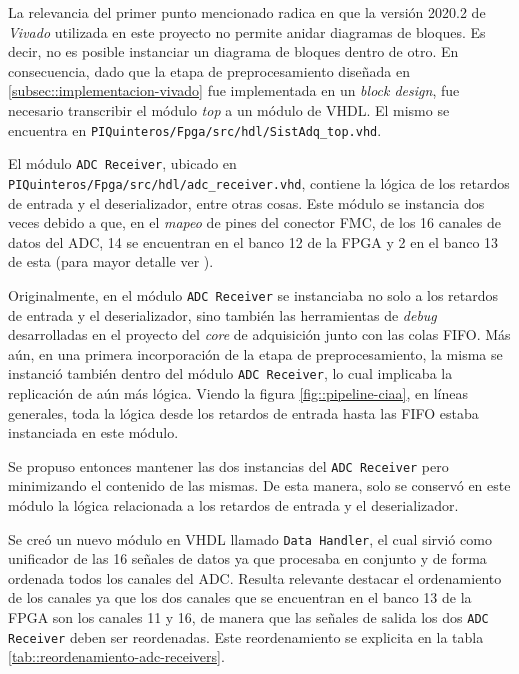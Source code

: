 \documentclass[../../main.tex]{subfiles}
\begin{document}
La relevancia del primer punto mencionado radica en que la versión 2020.2 de \textit{Vivado} utilizada en este proyecto no permite anidar diagramas de bloques. Es decir, no es posible instanciar un diagrama de bloques dentro de otro. En consecuencia, dado que la etapa de preprocesamiento diseñada en \ref{subsec::implementacion-vivado} fue implementada en un \textit{block design}, fue necesario transcribir el módulo \textit{top} a un módulo de VHDL. El mismo se encuentra en \texttt{PIQuinteros/Fpga/src/hdl/SistAdq\_top.vhd}.

El módulo \texttt{ADC Receiver}, ubicado en \texttt{PIQuinteros/Fpga/src/hdl/adc\_receiver.vhd}, contiene la lógica de los retardos de entrada y el deserializador, entre otras cosas. Este módulo se instancia dos veces debido a que, en el \textit{mapeo} de pines del conector FMC, de los 16 canales de datos del ADC, 14 se encuentran en el banco 12 de la FPGA y 2 en el banco 13 de esta (para mayor detalle ver \cite{proyecto-jose}).

Originalmente, en el módulo \texttt{ADC Receiver} se instanciaba no solo a los retardos de entrada y el deserializador, sino también las herramientas de \textit{debug} desarrolladas en el proyecto del \textit{core} de adquisición junto con las colas FIFO. Más aún, en una primera incorporación de la etapa de preprocesamiento, la misma se instanció también dentro del módulo \texttt{ADC Receiver}, lo cual implicaba la replicación de aún más lógica. Viendo la figura \ref{fig::pipeline-ciaa}, en líneas generales, toda la lógica desde los retardos de entrada hasta las FIFO estaba instanciada en este módulo.

Se propuso entonces mantener las dos instancias del \texttt{ADC Receiver} pero minimizando el contenido de las mismas. De esta manera, solo se conservó en este módulo la lógica relacionada a los retardos de entrada y el deserializador.

Se creó un nuevo módulo en VHDL llamado \texttt{Data Handler}, el cual sirvió como unificador de las 16 señales de datos ya que procesaba en conjunto y de forma ordenada todos los canales del ADC. Resulta relevante destacar el ordenamiento de los canales ya que los dos canales que se encuentran en el banco 13 de la FPGA son los canales 11 y 16, de manera que las señales de salida los dos \texttt{ADC Receiver} deben ser reordenadas. Este reordenamiento se explicita en la tabla \ref{tab::reordenamiento-adc-receivers}.
\end{document}
